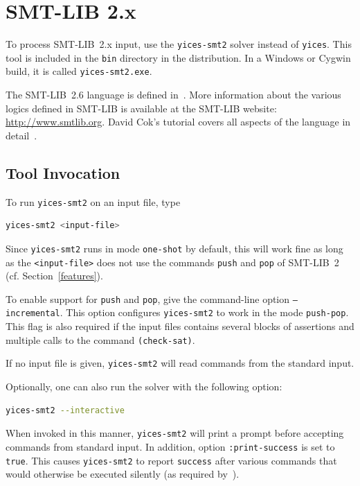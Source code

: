 \documentclass[11pt,twoside,fleqn,openright,titlepage]{cslreport}
\begin{document}
\section{SMT-LIB 2.x}

To process SMT-LIB~2.x input, use the \texttt{yices-smt2} solver
instead of \texttt{yices}. This tool is included in the \texttt{bin}
directory in the distribution. In a Windows or Cygwin build,
it is called \texttt{yices-smt2.exe}.

\medskip\noindent The SMT-LIB~2.6 language is defined
in~\cite{SMTLIB26:2017}. More information about the various logics
defined in SMT-LIB is available at the SMT-LIB website:
\url{http://www.smtlib.org}. David Cok's tutorial covers all aspects
of the language in detail~\cite{SMTLIB:tutorial:2013}.


\subsection{Tool Invocation}
\label{smt2-tool}

To run \texttt{yices-smt2} on an input file, type
\begin{small}
\begin{lstlisting}[language=sh]
   yices-smt2 <input-file>
\end{lstlisting}
\end{small}
Since \texttt{yices-smt2} runs in mode \texttt{one-shot} by default,
this will work fine as long as the \texttt{<input-file>} does not use
the commands \texttt{push} and \texttt{pop} of SMT-LIB~2
(cf. Section~\ref{features}).

\medskip\noindent To enable support for \texttt{push} and
\texttt{pop}, give the command-line option \texttt{--incremental}.
This option configures \texttt{yices-smt2} to work in the mode
\texttt{push-pop}. This flag is also required if the input files
contains several blocks of assertions and multiple calls to the
command \texttt{(check-sat)}.

\medskip\noindent If no input file is given,
\texttt{yices-smt2} will read commands from the standard
input.

\medskip\noindent Optionally, one can also run the solver with the
following option:
\begin{small}
\begin{lstlisting}[language=sh]
   yices-smt2 --interactive
\end{lstlisting}
\end{small}
When invoked in this manner, \texttt{yices-smt2} will print a prompt
before accepting commands from standard input. In addition, option
\texttt{:print-success} is set to \texttt{true}. This causes
\texttt{yices-smt2} to report \texttt{success} after various commands
that would otherwise be executed silently (as required
by~\cite{SMTLIB25:2015}).
\end{document}
